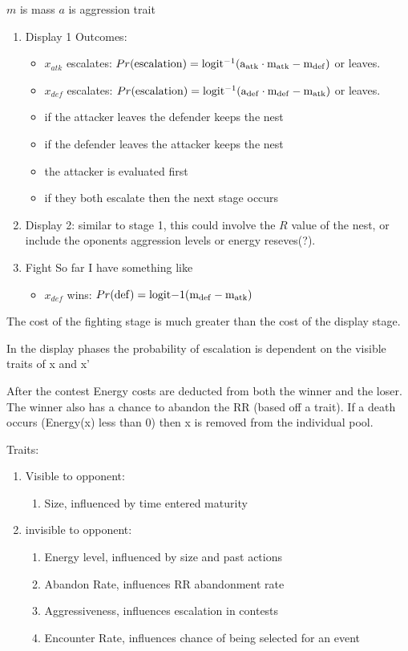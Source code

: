 \documentclass[a4paper,11pt]{article}
\begin{document}
$m$ is mass
$a$ is aggression trait
\begin{enumerate}
    \item Display 1
        Outcomes:
        \begin{itemize}
            \item $x_{atk}$ escalates: 
                $Pr(\rm{escalation}) =  logit^{-1}(a_{atk} \cdot m_{atk} - m_{def})$
                or leaves.
            \item $x_{def}$ escalates:
                $Pr(\rm{escalation}) =  logit^{-1}(a_{def} \cdot m_{def} - m_{atk})$ 
                or leaves.
            \item if the attacker leaves the defender keeps the nest
            \item if the defender leaves the attacker keeps the nest
            \item the attacker is evaluated first
            \item if they both escalate then the next stage occurs
        \end{itemize}
    \item Display 2:
        similar to stage 1, this could involve the $R$ value of the nest, or include the oponents aggression levels or energy reseves(?).
    \item Fight
        So far I have something like
        \begin{itemize}
            \item $x_{def}$ wins:
            $Pr(\rm{def}) = logit{-1}(m_{def} - m_{atk})$
        \end{itemize}
\end{enumerate}
The cost of the fighting stage is much greater than the cost of the display stage.

In the display phases the probability of escalation is dependent on the visible traits of x and x'

After the contest Energy costs are deducted from both the winner and the loser.
The winner also has a chance to abandon the RR (based off a trait).
If a death occurs (Energy(x) less than 0) then x is removed from the individual pool.

Traits:
\begin{enumerate}
    \item Visible to opponent:
    \begin{enumerate}
        \item Size, influenced by time entered maturity
    \end{enumerate}
    \item invisible to opponent:
    \begin{enumerate}
        \item Energy level, influenced by size and past actions
        \item Abandon Rate, influences RR abandonment rate
        \item Aggressiveness, influences escalation in contests
        \item Encounter Rate, influences chance of being selected for an event
    \end{enumerate}
\end{enumerate}
\clearpage
\end{document}
